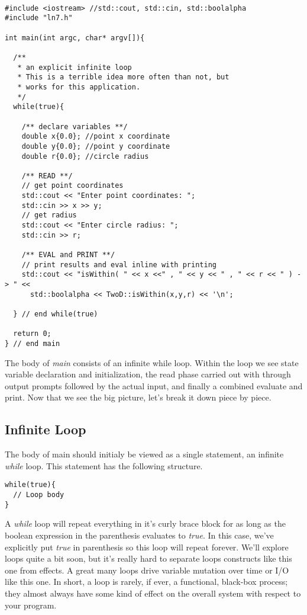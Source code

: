 \documentclass[]{tufte-handout}
\begin{document}
\begin{verbatim}

#include <iostream> //std::cout, std::cin, std::boolalpha
#include "ln7.h"

int main(int argc, char* argv[]){

  /**
   * an explicit infinite loop
   * This is a terrible idea more often than not, but
   * works for this application.
   */
  while(true){

    /** declare variables **/
    double x{0.0}; //point x coordinate
    double y{0.0}; //point y coordinate
    double r{0.0}; //circle radius

    /** READ **/
    // get point coordinates
    std::cout << "Enter point coordinates: ";
    std::cin >> x >> y;
    // get radius
    std::cout << "Enter circle radius: ";
    std::cin >> r;

    /** EVAL and PRINT **/
    // print results and eval inline with printing
    std::cout << "isWithin( " << x <<" , " << y << " , " << r << " ) -> " <<
      std::boolalpha << TwoD::isWithin(x,y,r) << '\n';

  } // end while(true)

  return 0;
} // end main
\end{verbatim}

The body of \textit{main} consists of an infinite while loop. Within the loop we see state variable declaration and initialization, the read phase carried out with through output prompts followed by the actual input, and finally a combined evaluate and print. Now that we see the big picture, let's break it down piece by piece.

\subsection{Infinite Loop}

The body of main should initialy be viewed as a single statement, an infinite \textit{while} loop. This statement has the following structure.
\begin{verbatim}
while(true){
  // Loop body
}
\end{verbatim}

A \textit{while} loop will repeat everything in it's curly brace block for as long as the boolean expression in the parenthesis evaluates to \textit{true}. In this case, we've explicitly put \textit{true} in parenthesis so this loop will repeat forever. We'll explore loops quite a bit soon, but it's really hard to separate loops constructs like this one from effects. A great many loops drive variable mutation over time or I/O like this one. In short, a loop is rarely, if ever, a functional, black-box process; they almost always have some kind of effect on the overall system with respect to your program.
\end{document}

